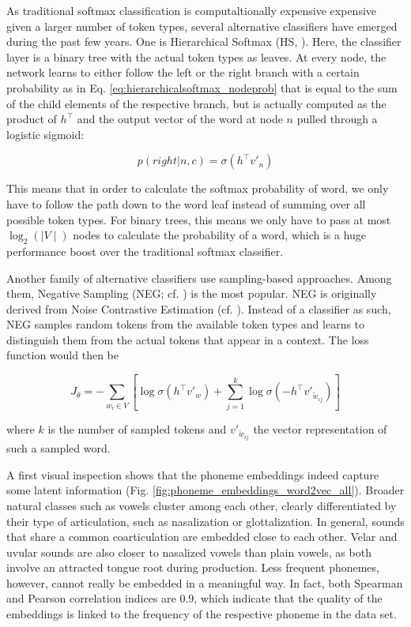 \documentclass[6pt]{article}
\begin{document}
As traditional softmax classification is computaltionally expensive expensive given a larger number of token types, several alternative classifiers have emerged during the past few years. One is Hierarchical Softmax (HS, \cite{morin2005hierarchical}). Here, the classifier layer is a binary tree with the actual token types as leaves. At every node, the network learns to either follow the left or the right branch with a certain probability as in Eq. \ref{eq:hierarchicalsoftmax_nodeprob} that is equal to the sum of the child elements of the respective  branch, but is actually computed as the product of $h^\top$ and the output vector of the word at node $n$ pulled through a logistic sigmoid:

\begin{equation}
p(right|n,c) = \sigma(h^\top v'_n) 
\label{eq:hierarchicalsoftmax_nodeprob}
\end{equation}

This means that in order to calculate the softmax probability of word, we only have to follow the path down to the word leaf instead of summing over all possible token types. For binary trees, this means we only have to pass at most $\log_2(\mid V\mid)$ nodes to calculate the probability of a word, which is a huge performance boost over the traditional softmax classifier. 

Another family of alternative classifiers use sampling-based approaches. Among them, Negative Sampling (NEG; cf. \cite{goldberg2014word2vec}) is the most popular. NEG is originally derived from Noise Contrastive Estimation (cf. \cite{gutmann2010noise,mnih2012fast}). Instead of a classifier as such, NEG samples random tokens from the available token types and learns to distinguish them from the actual tokens that appear in a context. The loss function would then be

\begin{equation}
J_{\theta}  = - \sum_{w_i \in V} [\log \sigma(h^{\top}v'_w)
+ \sum_{j=1}^{k}\log \sigma(-h^{\top}v'_{\tilde{w}_{ij}})]
\label{eq:neg_sampling_3}
\end{equation}

where $k$ is the number of sampled tokens and $v'_{\tilde{w}_{ij}}$ the vector representation of such a sampled word.

A first visual inspection shows that the phoneme embeddings indeed capture some latent information (Fig.  \ref{fig:phoneme_embeddings_word2vec_all}). Broader natural classes such as vowels cluster among each other,  clearly differentiated by their type of articulation, such as nasalization or glottalization. In general, sounds that share a common coarticulation are embedded close to each other. Velar and uvular sounds are also closer to nasalized vowels than plain vowels, as both involve an attracted tongue root during production. Less frequent phonemes, however, cannot really be embedded in a meaningful way. In fact, both Spearman and Pearson correlation indices are 0.9, which indicate that the quality of the embeddings is linked to the frequency of the respective phoneme in the data set.
\end{document}
